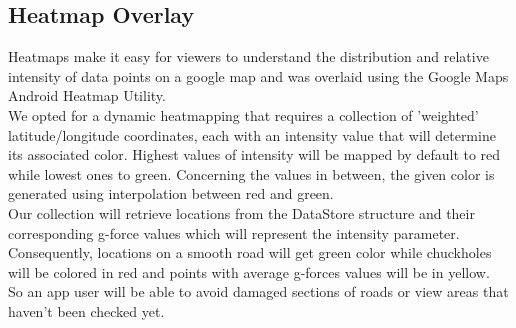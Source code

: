 \documentclass[10pt,a4paper]{article} %
\begin{document}
    
    \subsection{ Heatmap Overlay}
    
    Heatmaps make it easy for viewers to understand the distribution and relative intensity of data points on a google map and was overlaid using the Google Maps Android Heatmap Utility.\\
    We opted for a dynamic heatmapping that requires a collection of 'weighted' latitude/longitude coordinates, each with an intensity value that will determine its associated color.
    Highest values of intensity will be mapped by default to red while lowest ones to green. Concerning the values in between, the given color is generated using interpolation between red and green. \\
    Our collection will retrieve locations from the DataStore structure and their corresponding g-force values which will represent the intensity parameter. Consequently, locations on a smooth road will get green color while chuckholes will be colored in red and points with average g-forces values will be in yellow.\\
    So an app user will be able to avoid damaged sections of roads or view areas that haven't been checked yet.
     
\end{document}
